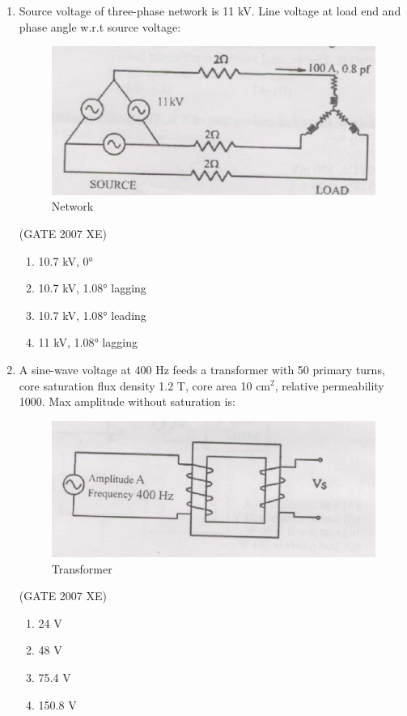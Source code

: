 \documentclass[journal,cmex10]{IEEEtran}
\theoremstyle{remark}
\numberwithin{equation}{enumi}
\numberwithin{figure}{enumi}
\begin{document}
\begin{enumerate}
    \item Source voltage of three-phase network is 11 kV. Line voltage at load end and phase angle w.r.t source voltage:
    \begin{figure}[htbp]
  \centering
  \includegraphics[width=0.6\columnwidth]{figs/C/fig4.png}
  \caption{Network}
  \label{fig:C/fig4.png}
\end{figure}
    
    \hfill{(GATE 2007 XE)}
    \begin{multicols}{2}
    \begin{enumerate}
        \item 10.7 kV, 0°
        \item 10.7 kV, 1.08° lagging
        \item 10.7 kV, 1.08° leading
        \item 11 kV, 1.08° lagging
    \end{enumerate}
\end{multicols}

\newpage

    \item A sine-wave voltage at 400 Hz feeds a transformer with 50 primary turns, core saturation flux density 1.2 T, core area 10 cm$^2$, relative permeability 1000. Max amplitude without saturation is:
    \begin{figure}[htbp]
  \centering
  \includegraphics[width=0.6\columnwidth]{figs/C/fig5.png}
  \caption{Transformer}
  \label{fig:C/fig5.png}
\end{figure}
    \hfill{(GATE 2007 XE)}
    \begin{multicols}{4}
    \begin{enumerate}
        \item 24 V
        \item 48 V
        \item 75.4 V
        \item 150.8 V
    \end{enumerate}
\end{multicols}


\end{enumerate}
\end{document}

